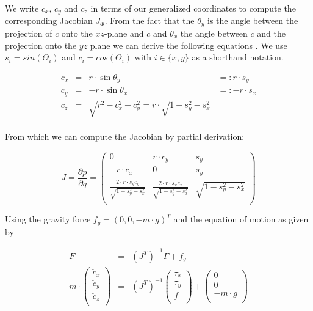 \documentclass[english,ngerman]{KITreprt}
\begin{document}
We write $c_x$, $c_y$ and $c_z$ in terms of our generalized coordinates
to compute the corresponding Jacobian $J_\Phi$. From the fact that the
$\theta_y$ is the angle between the projection of $c$ onto the
$xz$-plane and $c$ and $\theta_x$ the angle between $c$ and the
projection onto the $yz$ plane we can derive the following equations
\cite{kajita20013d}. We use $s_i = sin(\Theta_i)$ and
$c_i = cos(\Theta_i)$ with $i \in \{x, y\}$ as a shorthand notation.

\begin{equation}
\begin{array}{lcll} \label{eq:lip-xyz}
c_x & = & r \cdot \sin \theta_y & =: r \cdot s_y\\
c_y & = & -r \cdot \sin \theta_x & =: -r \cdot s_x \\
c_z & = & \sqrt{r^2 - c_x^2 - c_y^2} = r \cdot \sqrt{1 - s_y^2 - s_x^2} & \\
\end{array}
\end{equation}

From which we can compute the Jacobian by partial derivation:

\begin{equation} \label{eq:lip-Jacobian}
J = \frac{\partial p}{\partial q} = \left( \begin{array}{rcl}
0 & r \cdot c_y & s_y \\
-r \cdot c_x & 0 & s_y \\
\frac{2 \cdot r \cdot s_y c_y}{\sqrt{1 - s_y^2 - s_x^2}} & \frac{2 \cdot r \cdot s_x c_x}{\sqrt{1 - s_y^2 - s_x^2}} & \sqrt{1 - s_y^2 - s_x^2}\\
\end{array}
\right)
\end{equation}

Using the gravity force $f_g = (0, 0, -m \cdot g)^T$ and the equation of
motion as given by

\begin{equation}
\begin{array}{lcr}
F & = & (J^T)^{-1} \Gamma + f_g \\
m \cdot
\left(\begin{array}{c}
{\ddot c}_x \\
{\ddot c}_y \\
{\ddot c}_z \\
\end{array}\right)
& = & (J^T)^{-1}
\left(\begin{array}{c}
\tau_x \\
\tau_y \\
f \\
\end{array}\right)
+
\left(\begin{array}{c}
0 \\
0 \\
-m \cdot g \\
\end{array}\right) \\
\end{array}
\end{equation}
\end{document}

